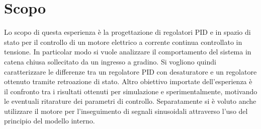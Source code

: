 \section{Scopo}
\label{sec:Scopo}

	Lo scopo di questa esperienza è la progettazione di regolatori PID e in spazio di stato per il controllo di un motore elettrico a corrente continua controllato in tensione. In particolar modo si vuole analizzare il comportamento del sistema in catena chiusa sollecitato da un ingresso a gradino. Si vogliono quindi caratterizzare le differenze tra un regolatore PID con desaturatore e un regolatore ottenuto tramite retroazione di stato. Altro obiettivo importate dell'esperienza è il confronto tra i risultati ottenuti per simulazione e sperimentalmente, motivando le eventuali ritarature dei parametri di controllo. Separatamente si è voluto anche utilizzare il motore per l'inseguimento di segnali sinusoidali attraverso l'uso del principio del modello interno. 